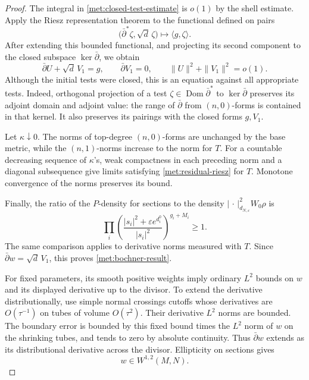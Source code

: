 \documentclass[11pt,letterpaper]{article}
\theoremstyle{definition}
\theoremstyle{remark}
\begin{document}
\begin{proof}
The integral in \eqref{met:closed-test-estimate} is \(o(1)\) by the
shell estimate.  Apply the Riesz representation theorem to the
functional defined on pairs
\[
 \bigl(\bar\partial^*\zeta,\sqrt d\,\zeta\bigr)
 \longmapsto\langle g,\zeta\rangle.
\]
After extending this bounded functional, and projecting its second
component to the closed subspace \(\ker\bar\partial\), we obtain
\begin{equation}
 \label{met:residual-riesz}
 \bar\partial U+\sqrt d\,V_1=g,
 \qquad \bar\partial V_1=0,
 \qquad \|U\|^2+\|V_1\|^2=o(1).
\end{equation}
Although the initial tests were closed, this is an equation against
all appropriate tests.  Indeed, orthogonal projection of a test
\(\zeta\in\operatorname{Dom}\bar\partial^*\) to
\(\ker\bar\partial\) preserves its adjoint domain and adjoint value:
the range of \(\bar\partial\) from \((n,0)\)-forms is contained in
that kernel.  It also preserves its pairings with the closed forms
\(g,V_1\).

Let \(\kappa\downarrow0\).  The norms of top-degree \((n,0)\)-forms
are unchanged by the base metric, while the \((n,1)\)-norms increase
to the norm for \(T\).  For a countable decreasing sequence of
\(\kappa\)'s, weak compactness in each preceding norm and a diagonal
subsequence give limits satisfying \eqref{met:residual-riesz} for
\(T\).  Monotone convergence of the norms preserves its bound.

Finally, the ratio of the \(P\)-density for sections to the density
\(|\,\cdot\,|_{d_{N,\varepsilon}}^2W_0\rho\) is
\begin{equation}
 \label{met:density-ratio}
 \prod_i\left(
   \frac{|s_i|^2+\varepsilon e^{d_i^0}}{|s_i|^2}
          \right)^{g_i+M_i}\geq1.
\end{equation}
The same comparison applies to derivative norms measured with \(T\).
Since \(\bar\partial w=\sqrt d\,V_1\), this proves
\eqref{met:bochner-result}.

For fixed parameters, its smooth positive weights imply ordinary
\(L^2\) bounds on \(w\) and its displayed derivative up to the
divisor.  To extend the derivative distributionally, use simple
normal crossings cutoffs whose derivatives are \(O(\tau^{-1})\) on
tubes of volume \(O(\tau^2)\).  Their derivative \(L^2\) norms are
bounded.  The boundary error is bounded by this fixed bound times
the \(L^2\) norm of \(w\) on the shrinking tubes, and tends to zero
by absolute continuity.  Thus \(\bar\partial w\) extends as its
distributional derivative across the divisor.  Ellipticity on
sections gives
\begin{equation}
 \label{met:sobolev-extension}
 w\in W^{1,2}(M,N).
\end{equation}


\end{proof}
\end{document}

